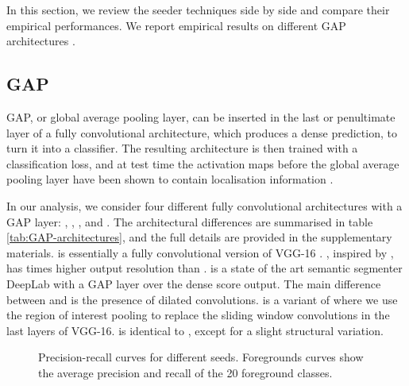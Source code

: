 \documentclass[british,10pt,twocolumn,letterpaper]{article}
\begin{document}
 In this section, we review the seeder techniques side by side and
 compare their empirical performances. We report empirical results
 on different GAP architectures \cite{zhou2015cnnlocalization,kolesnikov2016seed,Chen2016ArxivDeeplabv2}. 


\subsection{GAP}

\noindent GAP, or global average pooling layer, can be inserted in
the last or penultimate layer of a fully convolutional architecture,
which produces a dense prediction, to turn it into a classifier. The
resulting architecture is then trained with a classification loss,
and at test time the activation maps before the global average pooling
layer have been shown to contain localisation information \cite{zhou2015cnnlocaliz     ation}. 

In our analysis, we consider four different fully convolutional architectures
with a GAP layer: , ,
, and .
The architectural differences are summarised in table \ref{tab:GAP-architectures},
 and the full details are provided in the supplementary materials.
  \cite{zhou2015cnnlocalization}
 is essentially a fully convolutional version of VGG-16 \cite{Simonyan2015Iclr}.
 , inspired by \cite{kolesnikov2016seed},
 has  times higher output resolution than .
  is a state of the art semantic
 segmenter DeepLab with a GAP layer over the dense score output. The
 main difference between  and
  is the presence of dilated
 convolutions.  is a variant of
  where we use the region of
 interest pooling to replace the sliding window convolutions in the
 last layers of VGG-16.  is identical
 to , except for a slight structural
 variation.


\begin{figure}
\begin{centering}
\par\end{centering}
\begin{centering}
\par\end{centering}
\caption{\label{fig:comparing-seeds-methods}Precision-recall curves for different seeds. Foregrounds curves show the average precision and recall of the 20 foreground classes.}
\end{figure}
\end{document}
